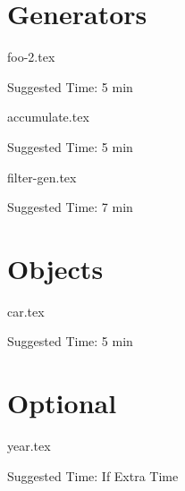 \documentclass{exam}
\begin{document}
\section{Generators}
\begin{questions}
    {foo-2.tex}
    \begin{questionmeta}
        Suggested Time: 5 min
    \end{questionmeta}

    {accumulate.tex}
    \begin{questionmeta}
        Suggested Time: 5 min
    \end{questionmeta}

    {filter-gen.tex}
    \begin{questionmeta}
        Suggested Time: 7 min
    \end{questionmeta}
\end{questions}

\section{Objects}
\begin{questions}
    {car.tex}
    \begin{questionmeta}
        Suggested Time: 5  min
    \end{questionmeta}
\end{questions}

\section{Optional}
\begin{questions}
    {year.tex}
    \begin{questionmeta}
        Suggested Time: If Extra Time
    \end{questionmeta}
\end{questions}
\end{document}
